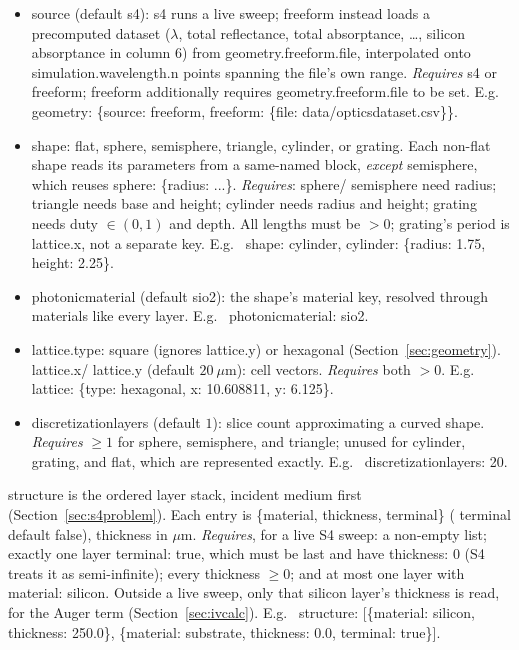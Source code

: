 \documentclass[11pt,a4paper,twoside]{article}
\DeclareRobustCommand{\code}[1]{\begingroup\upshape\ttfamily
  \def\_{\allowbreak\textunderscore\allowbreak}#1\endgroup}
\begin{document}
\begin{itemize}
  \item \code{source} (default \code{s4}): \code{s4} runs a live sweep;
        \code{freeform} instead loads a precomputed dataset (\(\lambda\),
        total reflectance, total absorptance, \ldots, silicon absorptance in
        column \(6\)) from \code{geometry.freeform.file}, interpolated onto
        \code{simulation.wavelength.n} points spanning the file's own range.
        \textit{Requires} \code{s4} or \code{freeform}; \code{freeform}
        additionally requires \code{geometry.freeform.file} to be set. E.g.\
        \code{geometry: \{source: freeform, freeform: \{file:
        data/optics\_dataset.csv\}\}}.
  \item \code{shape}: \code{flat}, \code{sphere}, \code{semisphere},
        \code{triangle}, \code{cylinder}, or \code{grating}. Each non-flat
        shape reads its parameters from a same-named block, \emph{except}
        \code{semisphere}, which reuses \code{sphere: \{radius: ...\}}.
        \textit{Requires}: \code{sphere}/\code{semisphere} need
        \code{radius}; \code{triangle} needs \code{base} and \code{height};
        \code{cylinder} needs \code{radius} and \code{height}; \code{grating}
        needs \code{duty} \(\in(0,1)\) and \code{depth}. All lengths must be
        \(>0\); \code{grating}'s period is \code{lattice.x}, not a separate
        key. E.g.\ \code{shape: cylinder, cylinder: \{radius: 1.75,
        height: 2.25\}}.
  \item \code{photonic\_material} (default \code{sio2}): the shape's
        material key, resolved through \code{materials} like every layer.
        E.g.\ \code{photonic\_material: sio2}.
  \item \code{lattice.type}: \code{square} (ignores \code{lattice.y}) or
        \code{hexagonal} (Section~\ref{sec:geometry}).
        \code{lattice.x}/\code{lattice.y} (default \(20\ \mu\)m): cell
        vectors. \textit{Requires} both \(>0\). E.g.\
        \code{lattice: \{type: hexagonal, x: 10.608811, y: 6.125\}}.
  \item \code{discretization\_layers} (default \(1\)): slice count
        approximating a curved shape. \textit{Requires} \(\geq 1\) for
        \code{sphere}, \code{semisphere}, and \code{triangle}; unused for
        \code{cylinder}, \code{grating}, and \code{flat}, which are
        represented exactly. E.g.\ \code{discretization\_layers: 20}.
\end{itemize}

\code{structure} is the ordered layer stack, incident medium first
(Section~\ref{sec:s4problem}). Each entry is \code{\{material, thickness,
terminal\}} (\code{terminal} default \code{false}), thickness in \(\mu\)m.
\textit{Requires}, for a live S4 sweep: a non-empty list; exactly one layer
\code{terminal: true}, which must be last and have \code{thickness: 0} (S4
treats it as semi-infinite); every thickness \(\geq 0\); and at most one
layer with \code{material: silicon}. Outside a live sweep, only that silicon
layer's thickness is read, for the Auger term (Section~\ref{sec:ivcalc}). E.g.\
\code{structure: [\{material: silicon, thickness: 250.0\}, \{material:
substrate, thickness: 0.0, terminal: true\}]}.
\end{document}
